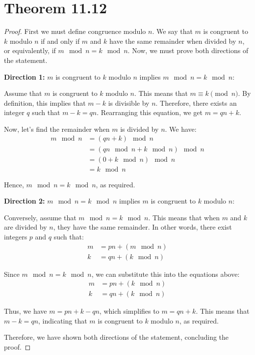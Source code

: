 \documentclass{article}
\renewcommand{\_}{\ifincsname_\else\legacyunderscore\fi}
\begin{document}
\section{Theorem 11.12}
\begin{proof}

First we must define congruence modulo $n$. We say that $m$ is congruent to $k$ modulo $n$ if and only if $m$ and $k$ have the same remainder when divided by $n$, or equivalently, if $m\mod n = k \mod n$. Now, we must prove both directions of the statement.

    \textbf{Direction 1:} $m$ is congruent to $k$ modulo $n$ implies $m \mod n = k \mod n$:

Assume that $m$ is congruent to $k$ modulo $n$. This means that $m \equiv k \pmod{n}$. By definition, this implies that $m - k$ is divisible by $n$. Therefore, there exists an integer $q$ such that $m - k = qn$. Rearranging this equation, we get $m = qn + k$.

Now, let's find the remainder when $m$ is divided by $n$. We have:
\begin{align*}
    m \mod n &= (qn + k) \mod n \\
    &= (qn \mod n + k \mod n) \mod n \\
    &= (0 + k \mod n) \mod n \\
    &= k \mod n
\end{align*}

Hence, $m \mod n = k \mod n$, as required.

\textbf{Direction 2:} $m \mod n = k \mod n$ implies $m$ is congruent to $k$ modulo $n$:

Conversely, assume that $m \mod n = k \mod n$. This means that when $m$ and $k$ are divided by $n$, they have the same remainder. In other words, there exist integers $p$ and $q$ such that:
\begin{align*}
    m &= pn + (m \mod n) \\
    k &= qn + (k \mod n)
\end{align*}

Since $m \mod n = k \mod n$, we can substitute this into the equations above:
\begin{align*}
    m &= pn + (k \mod n) \\
    k &= qn + (k \mod n)
\end{align*}

Thus, we have $m = pn + k - qn$, which simplifies to $m = qn + k$. This means that $m - k = qn$, indicating that $m$ is congruent to $k$ modulo $n$, as required.

Therefore, we have shown both directions of the statement, concluding the proof.

\end{proof}
\end{document}
